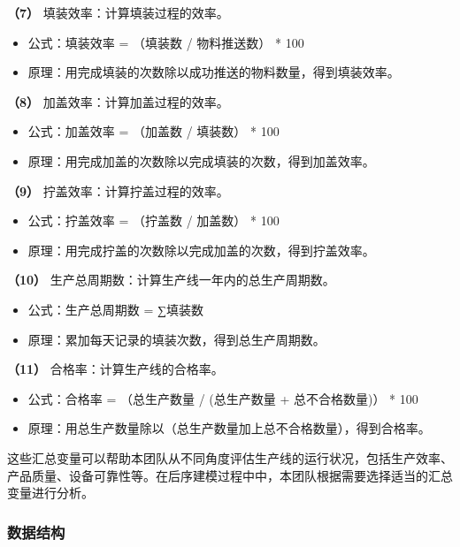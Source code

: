 \documentclass[withoutpreface,bwprint]{cumcmthesis}
\begin{document}
\textbf{（7）} 填装效率：计算填装过程的效率。

\begin{itemize}
    \item 公式：填装效率 = （填装数 / 物料推送数） * 100%
    \item 原理：用完成填装的次数除以成功推送的物料数量，得到填装效率。
\end{itemize}

\textbf{（8）} 加盖效率：计算加盖过程的效率。

\begin{itemize}
    \item 公式：加盖效率 = （加盖数 / 填装数） * 100%
    \item 原理：用完成加盖的次数除以完成填装的次数，得到加盖效率。
\end{itemize}

\textbf{（9）} 拧盖效率：计算拧盖过程的效率。

\begin{itemize}
    \item 公式：拧盖效率 = （拧盖数 / 加盖数） * 100%
    \item 原理：用完成拧盖的次数除以完成加盖的次数，得到拧盖效率。
\end{itemize}

\textbf{（10）} 生产总周期数：计算生产线一年内的总生产周期数。

\begin{itemize}
    \item 公式：生产总周期数 = ∑填装数
    \item 原理：累加每天记录的填装次数，得到总生产周期数。
\end{itemize}

\textbf{（11）} 合格率：计算生产线的合格率。

\begin{itemize}
    \item 公式：合格率 = （总生产数量 / (总生产数量 + 总不合格数量)） * 100%
    \item 原理：用总生产数量除以（总生产数量加上总不合格数量），得到合格率。
\end{itemize}

这些汇总变量可以帮助本团队从不同角度评估生产线的运行状况，包括生产效率、产品质量、设备可靠性等。在后序建模过程中中，本团队根据需要选择适当的汇总变量进行分析。

\subsubsection{数据结构}
\end{document}
